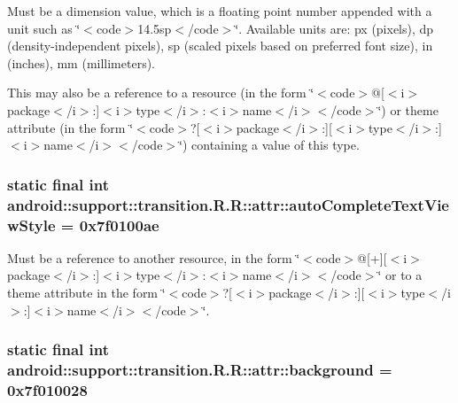 Must be a dimension value, which is a floating point number appended with a unit such as \char`\"{}$<$code$>$14.5sp$<$/code$>$\char`\"{}. Available units are: px (pixels), dp (density-independent pixels), sp (scaled pixels based on preferred font size), in (inches), mm (millimeters). 

This may also be a reference to a resource (in the form \char`\"{}$<$code$>$@\mbox{[}$<$i$>$package$<$/i$>$:\mbox{]}$<$i$>$type$<$/i$>$:$<$i$>$name$<$/i$>$$<$/code$>$\char`\"{}) or theme attribute (in the form \char`\"{}$<$code$>$?\mbox{[}$<$i$>$package$<$/i$>$:\mbox{]}\mbox{[}$<$i$>$type$<$/i$>$:\mbox{]}$<$i$>$name$<$/i$>$$<$/code$>$\char`\"{}) containing a value of this type. \hypertarget{classandroid_1_1support_1_1transition_1_1_r_1_1attr_9813ac8c33bcd7f5cbf9cbea09917821}{
\subsubsection[{autoCompleteTextViewStyle}]{\setlength{\rightskip}{0pt plus 5cm}static final int android::support::transition.R.R::attr::autoCompleteTextViewStyle = 0x7f0100ae}}
\label{classandroid_1_1support_1_1transition_1_1_r_1_1attr_9813ac8c33bcd7f5cbf9cbea09917821}


Must be a reference to another resource, in the form \char`\"{}$<$code$>$@\mbox{[}+\mbox{]}\mbox{[}$<$i$>$package$<$/i$>$:\mbox{]}$<$i$>$type$<$/i$>$:$<$i$>$name$<$/i$>$$<$/code$>$\char`\"{} or to a theme attribute in the form \char`\"{}$<$code$>$?\mbox{[}$<$i$>$package$<$/i$>$:\mbox{]}\mbox{[}$<$i$>$type$<$/i$>$:\mbox{]}$<$i$>$name$<$/i$>$$<$/code$>$\char`\"{}. \hypertarget{classandroid_1_1support_1_1transition_1_1_r_1_1attr_ba62ead52d1c8e11386d836f2a630cc5}{
\subsubsection[{background}]{\setlength{\rightskip}{0pt plus 5cm}static final int android::support::transition.R.R::attr::background = 0x7f010028}}
\label{classandroid_1_1support_1_1transition_1_1_r_1_1attr_ba62ead52d1c8e11386d836f2a630cc5}


